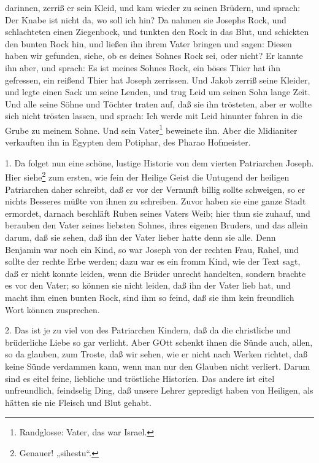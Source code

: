 darinnen, zerriß er sein Kleid, und kam wieder zu seinen Brüdern, und sprach: Der Knabe ist nicht da, wo soll ich hin? Da nahmen sie Josephs Rock, und schlachteten einen Ziegenbock, und tunkten den Rock in das Blut, und schickten den bunten Rock hin, und ließen ihn ihrem Vater bringen und sagen: Diesen haben wir gefunden, siehe, ob es deines Sohnes Rock sei, oder nicht? Er kannte ihn aber, und sprach: Es ist meines Sohnes Rock, ein böses Thier hat ihn gefressen, ein reißend Thier hat Joseph zerrissen. Und Jakob zerriß seine Kleider, und legte einen Sack um seine Lenden, und trug Leid um seinen Sohn lange Zeit. Und alle seine Söhne und Töchter traten auf, daß sie ihn trösteten, aber er wollte sich nicht trösten lassen, und sprach: Ich werde mit Leid hinunter fahren in die Grube zu meinem Sohne. Und sein Vater\footnote{Randglosse: Vater, das war Israel.} beweinete ihn. Aber die Midianiter verkauften ihn in Egypten dem Potiphar, des Pharao Hofmeister.

1. Da folget nun eine schöne, lustige Historie von dem vierten Patriarchen Joseph. Hier siehe\footnote{Genauer! „sihestu“.} zum ersten, wie fein der Heilige Geist die Untugend der heiligen Patriarchen daher schreibt,
daß er vor der Vernunft billig sollte schweigen, so er nichts Besseres müßte von ihnen zu schreiben. Zuvor haben sie eine ganze Stadt ermordet, darnach beschläft Ruben seines Vaters Weib; hier thun sie zuhauf, und berauben den Vater seines liebsten Sohnes, ihres eigenen Bruders, und das allein darum, daß sie sehen, daß ihn der Vater lieber hatte denn sie alle. Denn Benjamin war noch ein Kind, so war Joseph von der rechten Frau, Rahel, und sollte der rechte Erbe werden; dazu war es ein fromm Kind, wie der Text sagt, daß er nicht konnte leiden, wenn die Brüder unrecht handelten, sondern brachte es vor den Vater; so können sie nicht leiden, daß ihn der Vater lieb hat, und macht ihm einen bunten Rock, sind ihm so feind, daß sie ihm kein freundlich Wort können zusprechen.

2. Das ist je zu viel von des Patriarchen Kindern, daß da die christliche und brüderliche Liebe so gar verlicht. Aber GOtt schenkt ihnen die Sünde auch, allen, so da glauben, zum Troste, daß wir sehen, wie er nicht nach Werken richtet, daß keine Sünde verdammen kann, wenn man nur den Glauben nicht verliert. Darum sind es eitel feine, liebliche und tröstliche Historien. Das andere ist eitel unfreundlich, feindselig Ding, daß unsere Lehrer gepredigt haben von Heiligen, als hätten sie nie Fleisch und Blut gehabt.

